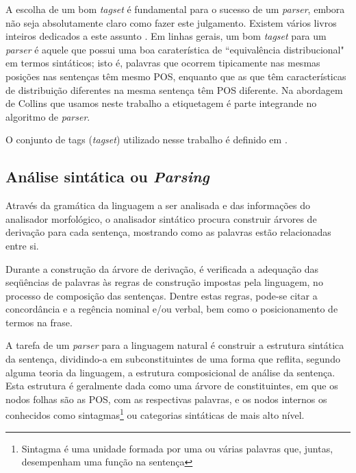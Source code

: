 A escolha de um bom \emph{tagset} é fundamental para o sucesso de um \emph{parser}, embora não seja absolutamente claro como fazer este julgamento. Existem vários livros inteiros dedicados a este assunto \cite{abeille03} \cite{sardinha04}. Em linhas gerais, um bom \emph{tagset} para um \emph{parser} é aquele que possui uma boa caraterística de ``equivalência distribucional" em termos sintáticos; isto é, palavras que ocorrem tipicamente nas mesmas posições nas sentenças têm mesmo POS, enquanto que as que têm características de distribuição diferentes na mesma sentença têm POS diferente. Na abordagem de Collins \cite{collins99} que usamos neste trabalho a etiquetagem é parte integrande no algoritmo de \emph{parser}.

O conjunto de tags (\emph{tagset}) utilizado nesse trabalho é definido em \cite{florestasintatica}.

\subsection{Análise sintática ou \emph{Parsing}} %
\label{sub:analise_sintatica_ou_parsing}

Através da gramática da linguagem a ser analisada e das informações do analisador morfológico, o analisador sintático procura construir árvores de derivação para cada sentença, mostrando como as palavras estão relacionadas entre si.

Durante a construção da árvore de derivação, é verificada a adequação das seqüências de palavras às regras de construção impostas pela linguagem, no processo de composição das sentenças. Dentre estas regras, pode-se citar a concordância e a regência nominal e/ou verbal, bem como o posicionamento de termos na frase.

A tarefa de um \emph{parser} para a linguagem natural é construir a estrutura sintática da sentença, dividindo-a em subconstituintes de uma forma que reflita, segundo alguma teoria da linguagem, a estrutura composicional de análise da sentença. Esta estrutura é geralmente dada como uma árvore de constituintes, em que os nodos folhas são as POS, com as respectivas palavras, e os nodos internos os conhecidos como sintagmas\footnote{Sintagma é uma unidade formada por uma ou várias palavras que, juntas, desempenham uma função na sentença} ou categorias sintáticas de mais alto nível.

